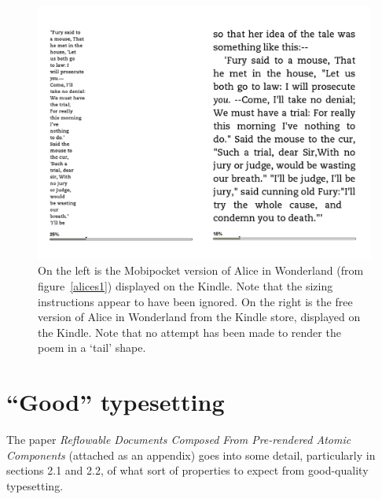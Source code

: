 \begin{figure}[tb]
\begin{center}
\vspace{-.3in}
\includegraphics[width=\textwidth]{gfx/alices2}
\end{center}
\vspace{-.3in}
\caption[The same document displayed on the Kindle]{On
the left is the Mobipocket version of Alice in Wonderland (from figure~\ref{alices1}) displayed on
the Kindle. Note that the sizing instructions appear to have been ignored. On the right is the free
version of Alice in Wonderland from the Kindle store, displayed on the Kindle. Note that no attempt
has been made to render the poem in a `tail' shape.}
\label{alices2}
\end{figure}

\section{``Good'' typesetting}
\label{goodtypesetting}
The paper \emph{Reflowable Documents Composed From Pre-rendered Atomic Components}\cite{Pinkney2011}
(attached as an appendix) goes into some detail, particularly in sections 2.1 and 2.2, of what sort
of properties to expect from good-quality typesetting.



